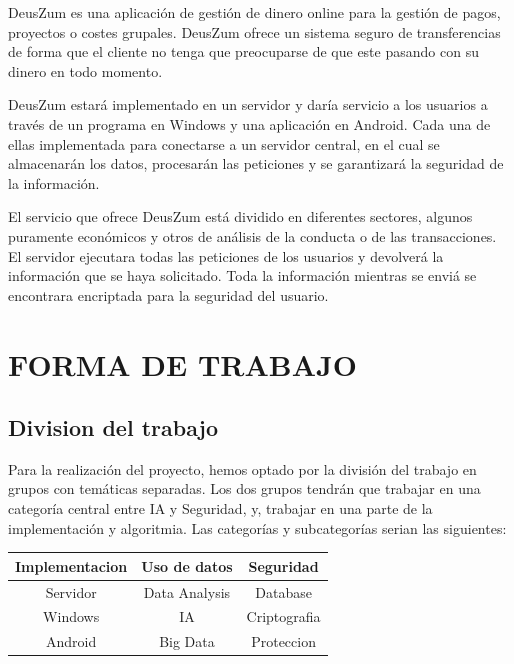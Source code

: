 \documentclass{article}
\theoremstyle{definition}
\begin{document}
DeusZum es una aplicación de gestión de dinero online para la gestión de pagos, proyectos o costes grupales. DeusZum ofrece un sistema seguro de transferencias de forma que el cliente no tenga que preocuparse de que este pasando con su dinero en todo momento.

DeusZum estará implementado en un servidor y daría servicio a los usuarios a través de un programa en Windows y una aplicación en Android. Cada una de ellas implementada para conectarse a un servidor central, en el cual se almacenarán los datos, procesarán las peticiones y se garantizará la seguridad de la información.

El servicio que ofrece DeusZum está dividido en diferentes sectores, algunos puramente económicos y otros de análisis de la conducta o de las transacciones. El servidor ejecutara todas las peticiones de los usuarios y devolverá la información que se haya solicitado. Toda la información mientras se enviá se encontrara encriptada para la seguridad del usuario.

\section{FORMA DE TRABAJO}


\subsection{Division del trabajo}

Para la realización del proyecto, hemos optado por la división del trabajo en grupos con temáticas separadas. Los dos grupos tendrán que trabajar en una categoría central entre IA y Seguridad, y, trabajar en una parte de la implementación y algoritmia. Las categorías y subcategorías serian las siguientes:

\begin{center}
\begin{tabular}{|c|c|c|}
	\hline	
	\cellcolor{cyan!12} Implementacion & \cellcolor{cyan!12}Uso de datos & \cellcolor{cyan!12}Seguridad \\ \hline
	Servidor & Data Analysis & Database \\
	Windows & IA & Criptografia \\
	Android & Big Data & Proteccion \\
	\hline
	
\end{tabular}
\end{center}
\end{document}
